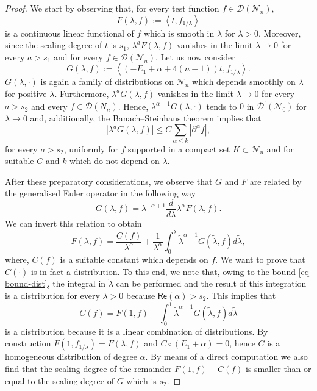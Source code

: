 \documentclass[11pt]{book}
\renewcommand{\Re}{\mathsf{Re}}
\newcommand{\Dcal}{\mathcal{D}}
\newcommand{\Ncal}{\mathcal{N}}
\theoremstyle{break}
\begin{document}
\begin{proof}





We start by observing that, for every test function $f\in\Dcal(\Ncal_n)$, 
\[
F(\lambda, f) := \left\langle t, f_{1/\lambda} \right\rangle
\] 
is a continuous linear functional of $f$ which is smooth in $\lambda$ for $\lambda>0$. Moreover, since the scaling degree of $t$ is $s_1$, $\lambda^{a}F(\lambda, f)$ vanishes in the limit $\lambda \to 0$ for every $a > s_1$ and for every $f\in\Dcal(\Ncal_n)$.
Let us now consider 
\[
G(\lambda, f)  :=  \left\langle(-E_1+\alpha+4(n-1))t, f_{1/\lambda}\right\rangle. 
\]
$G(\lambda, \cdot)$ is again a family of distributions on $\Ncal_n$ which depends smoothly on $\lambda$ for positive $\lambda$. Furthermore, $\lambda^{a}G(\lambda, f)$ vanishes in the limit $\lambda\to 0$ for every $a > s_2$ and every $f\in\Dcal(N_n)$. Hence,  
$\lambda^{\alpha-1} G(\lambda, \cdot)$ tends to $0$ in $\Dcal^\prime(\Ncal_0)$ for $\lambda\to 0$ and, additionally, the Banach--Steinhaus theorem implies that 
\begin{equation}\label{eq-bound-dist}
\left| \lambda^{a} G(\lambda,f) \right|  \leq C \sum_{\alpha\leq k} |\partial^{\alpha} f|,
\end{equation}
for every $a>s_2$, uniformly for $f$ supported in a compact set $K\subset \Ncal_n$ and for suitable $C$ and $k$ which do not depend on $\lambda$.

After these preparatory considerations, we observe that $G$ and $F$ are related by the generalised Euler operator in the following way
\[
G(\lambda, f) =  \lambda^{-\alpha+1} \frac{d}{d\lambda} \lambda^{\alpha} F(\lambda, f).
\]
We can invert this relation to obtain
\[
F(\lambda, f) =  \frac{C(f)}{\lambda^{\alpha}} + \frac{1}{\lambda^\alpha} \int_0^\lambda  \tilde{\lambda}^{\alpha-1} G(\tilde{\lambda}, f) d\tilde{\lambda},
\]
where, $C(f)$ is a suitable constant which depends on $f$. We want to prove that $C(\cdot)$ is in fact a distribution. To this end, we note that, owing to the bound \eqref{eq-bound-dist}, the integral in $\tilde\lambda$ can be performed and the result of this integration is a distribution for every $\lambda > 0$ because $\Re(\alpha) > s_2$.  
This implies that 
\[
C(f) = F(1, f)  - \int_0^1  \tilde{\lambda}^{\alpha-1} G(\tilde{\lambda}, f) d\tilde{\lambda}
\]
is a distribution because it is a linear combination of distributions. By construction $F(1,f_{1/\lambda})=F(\lambda,f)$ and $C\circ (E_1+\alpha) =0$, hence $C$ is a homogeneous distribution of degree $\alpha$. By means of a direct computation we also find that the scaling degree of the remainder $F(1,f)-C(f)$ is smaller than or equal to the scaling degree of $G$ which is $s_2$.






\end{proof}
\end{document}
